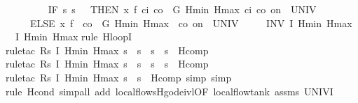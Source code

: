 \documentclass[envcountsame]{llncs}
\begin{document}
\begin{example}
\begin{isabellebody}
\ \ \ \ %
\isanewline
\ \ \ \ {\isacharparenleft}IF\ {\isacharparenleft}{\isasymlambda}s{\isachardot}\ s{\isachardollar}{}\ {\isacharequal}\ {}{\isacharparenright}\ THEN\ {\isacharparenleft}x{\isasymacute}{\isacharequal}\ f\ c\isactrlsub i\ c\isactrlsub o\ {\isacharampersand}\ G\ Hmin\ Hmax\ c\isactrlsub i\ c\isactrlsub o\ on\ {\isacharbraceleft}{}{\isachardot}{\isachardot}{\isasymtau}{\isacharbraceright}\ UNIV\ {\isacharat}\ {}{\isacharparenright}\ \isanewline
\ \ \ \ \ ELSE\ {\isacharparenleft}x{\isasymacute}{\isacharequal}\ f\ {}\ c\isactrlsub o\ {\isacharampersand}\ G\ Hmin\ Hmax\ {}\ c\isactrlsub o\ on\ {\isacharbraceleft}{}{\isachardot}{\isachardot}{\isasymtau}{\isacharbraceright}\ UNIV\ {\isacharat}\ {}{\isacharparenright}{\isacharparenright}\ {\isacharparenright}\isanewline
\ \ INV\ I\ Hmin\ Hmax{\isacharparenright}\isanewline
\ \ {\isasymlceil}I\ Hmin\ Hmax{\isasymrceil}{\isachardoublequoteclose}\isanewline
{}\isamarkupfalse%
{\isacharparenleft}rule\ H{\isacharunderscore}loopI{\isacharparenright}\isanewline
\ \ \ \ \isamarkupfalse%
{\isacharparenleft}rule{\isacharunderscore}tac\ R{\isacharequal}{\isachardoublequoteopen}{\isasymlambda}s{\isachardot}\ I\ Hmin\ Hmax\ s\ {\isasymand}\ s{\isachardollar}{}{\isacharequal}{}\ {\isasymand}\ s{\isachardollar}{}\ {\isacharequal}\ s{\isachardollar}{}{\isachardoublequoteclose}\ \ H{\isacharunderscore}comp{\isacharparenright}\isanewline
\ \ \ \ \ \isamarkupfalse%
{\isacharparenleft}rule{\isacharunderscore}tac\ R{\isacharequal}{\isachardoublequoteopen}{\isasymlambda}s{\isachardot}\ I\ Hmin\ Hmax\ s\ {\isasymand}\ s{\isachardollar}{}{\isacharequal}{}\ {\isasymand}\ s{\isachardollar}{}\ {\isacharequal}\ s{\isachardollar}{}{\isachardoublequoteclose}\ \ H{\isacharunderscore}comp{\isacharparenright}\isanewline
\ \ \ \ \ \ \isamarkupfalse%
{\isacharparenleft}rule{\isacharunderscore}tac\ R{\isacharequal}{\isachardoublequoteopen}{\isasymlambda}s{\isachardot}\ I\ Hmin\ Hmax\ s\ {\isasymand}\ s{\isachardollar}{}{\isacharequal}{}{\isachardoublequoteclose}\ \ H{\isacharunderscore}comp{\isacharcomma}\ simp{\isacharcomma}\ simp{\isacharparenright}\isanewline
\ \ \ \ \ \isamarkupfalse%
{\isacharparenleft}rule\ H{\isacharunderscore}cond{\isacharcomma}\ simp{\isacharunderscore}all\ add{\isacharcolon}\ local{\isacharunderscore}flow{\isachardot}sH{\isacharunderscore}g{\isacharunderscore}ode{\isacharunderscore}ivl{\isacharbrackleft}OF\ local{\isacharunderscore}flow{\isacharunderscore}tank\ assms{\isacharparenleft}{}{\isacharparenright}\ UNIV{\isacharunderscore}I{\isacharbrackright}{\isacharparenright}\isanewline

\end{isabellebody}
\end{example}
\end{document}
